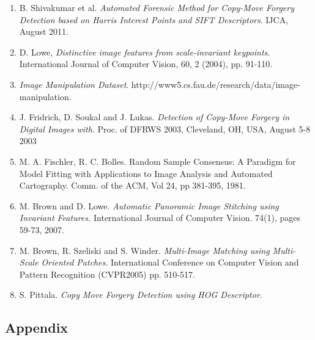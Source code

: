 \documentclass[12pt]{article}
\begin{document}
\begin{enumerate}
\item B. Shivakumar et al. {\it Automated Forensic Method for Copy-Move Forgery Detection based on Harris Interest Points and SIFT Descriptors}. IJCA, August 2011. 
\item D. Lowe, {\it Distinctive image features from scale-invariant keypoints}. International Journal of Computer Vision, 60, 2 (2004), pp. 91-110.
\item {\it Image Manipulation Dataset}. http://www5.cs.fau.de/research/data/image-manipulation. 
\item J. Fridrich, D. Soukal and J. Lukas. {\it Detection of Copy-Move Forgery in Digital Images with}. Proc. of DFRWS 2003, Cleveland, OH, USA, August 5-8 2003
\item M. A. Fischler, R. C. Bolles. Random Sample Consensus: A Paradigm for Model Fitting with Applications to Image Analysis and Automated Cartography. Comm. of the ACM, Vol 24, pp 381-395, 1981. 
\item M. Brown and D. Lowe. {\it Automatic Panoramic Image Stitching using Invariant Features.} International Journal of Computer Vision. 74(1), pages 59-73, 2007.
\item M. Brown, R. Szeliski and S. Winder. {\it Multi-Image Matching using Multi-Scale Oriented Patches}. International Conference on Computer Vision and Pattern Recognition (CVPR2005) pp. 510-517.
\item S. Pittala. {\it Copy Move Forgery Detection using HOG Descriptor}.
\end{enumerate}

\subsection*{Appendix}
\end{document}
